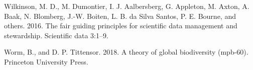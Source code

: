 \documentclass[
  12pt,
]{article}
\newlength{\cslhangindent}
\newenvironment{cslreferences}%
  {\setlength{\parindent}{0pt}%
  \everypar{\setlength{\hangindent}{\cslhangindent}}\ignorespaces}%
  {\par}
\begin{document}
\begin{cslreferences}
\leavevmode\hypertarget{ref-wilkinson2016fair}{}%
Wilkinson, M. D., M. Dumontier, I. J. Aalbersberg, G. Appleton, M. Axton, A. Baak, N. Blomberg, J.-W. Boiten, L. B. da Silva Santos, P. E. Bourne, and others. 2016. The fair guiding principles for scientific data management and stewardship. Scientific data 3:1--9.

\leavevmode\hypertarget{ref-worm2018theory}{}%
Worm, B., and D. P. Tittensor. 2018. A theory of global biodiversity (mpb-60). Princeton University Press.
\end{cslreferences}
\end{document}
